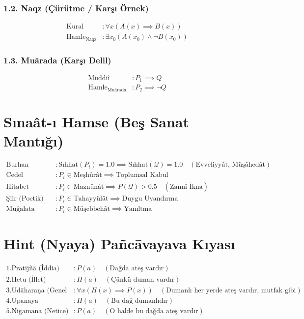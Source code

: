 \documentclass[11pt, a4paper]{article}
\begin{document}
\subsubsection{1.2. Naqz (Çürütme / Karşı Örnek)}
\begin{align}
\text{Kural} &: \forall x (A(x) \implies B(x)) \\
\text{Hamle}_{\text{Naqz}} &: \exists x_0 (A(x_0) \land \neg B(x_0))
\end{align}

\subsubsection{1.3. Muârada (Karşı Delil)}
\begin{align}
\text{Müddiî} &: P_1 \implies Q \\
\text{Hamle}_{\text{Muârada}} &: P_2 \implies \neg Q
\end{align}

\section{Sınaât-ı Hamse (Beş Sanat Mantığı)}

\begin{align}
\text{Burhan (Kesin)} &: \text{Sıhhat}(P_i) = 1.0 \implies \text{Sıhhat}(\mathcal{Q}) = 1.0 \quad (\text{Evveliyyât, Müşâhedât}) \\
\text{Cedel (Diyalektik)} &: P_i \in \text{Meşhûrât} \implies \text{Toplumsal Kabul} \\
\text{Hitabet (Retorik)} &: P_i \in \text{Maznûnât} \implies P(\mathcal{Q}) > 0.5 \quad (\text{Zannî İkna}) \\
\text{Şiir (Poetik)} &: P_i \in \text{Tahayyülât} \implies \text{Duygu Uyandırma} \\
\text{Muğalata (Safsata)} &: P_i \in \text{Müşebbehât} \implies \text{Yanıltma}
\end{align}

\section{Hint (Nyaya) Pañcāvayava Kıyası}

\begin{align}
1. \text{Pratijñā (İddia)} &: P(a) \quad (\text{Dağda ateş vardır}) \\
2. \text{Hetu (İllet)} &: H(a) \quad (\text{Çünkü duman vardır}) \\
3. \text{Udāharaṇa (Genel Örnek)} &: \forall x (H(x) \implies P(x)) \quad (\text{Dumanlı her yerde ateş vardır, mutfak gibi}) \\
4. \text{Upanaya (Uygulama)} &: H(a) \quad (\text{Bu dağ dumanlıdır}) \\
5. \text{Nigamana (Netice)} &: P(a) \quad (\text{O halde bu dağda ateş vardır})
\end{align}
\end{document}
